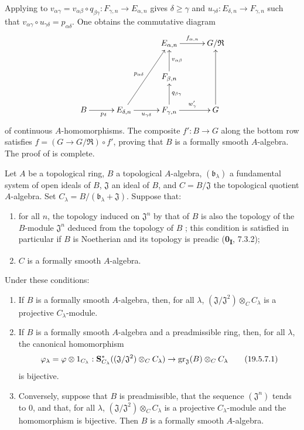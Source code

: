 \begin{env}[19.5.6.8]
Applying  to
$v_{\alpha\gamma}=v_{\alpha\beta}\circ q_{\beta\gamma}:F_{\gamma,n}\to E_{\alpha,n}$
gives $\delta\geq\gamma$ and $u_{\gamma\delta}:E_{\delta,n}\to F_{\gamma,n}$ such that
$v_{\alpha\gamma}\circ u_{\gamma\delta}=p_{\alpha\delta}$.
One obtains the commutative diagram
\[
\xymatrix@C=3em@R=2.5em{
  && E_{\alpha,n} \ar[r]^{f_{\alpha,n}} & G/\mathfrak{R} \\
  && F_{\beta,n} \ar[u]_{v_{\alpha\beta}} & \\
  B \ar[r]_{p_\delta} & E_{\delta,n} \ar[uur]^{p_{\alpha\delta}} \ar[r]_{u_{\gamma\delta}} & F_{\gamma,n} \ar[u]_{q_{\beta\gamma}} \ar[r]^{w'_\gamma} & G \ar[uu]
}
\]
of continuous $A$-homomorphisms.
The composite $f':B\to G$ along the bottom row satisfies $f=(G\to G/\mathfrak{R})\circ f'$, proving that $B$ is a formally smooth $A$-algebra.
The proof of  is complete.
\end{env}

\begin{corollary}[19.5.7]
\label{0.19.5.7}
Let $A$ be a topological ring, $B$ a topological $A$-algebra, $(\mathfrak{b}_\lambda)$ a fundamental system of open ideals of $B$, $\mathfrak{J}$ an ideal of $B$, and $C=B/\mathfrak{J}$ the topological quotient $A$-algebra.
Set $C_\lambda=B/(\mathfrak{b}_\lambda+\mathfrak{J})$.
Suppose that:
\begin{enumerate}
  \item[$1^\circ$] for all $n$, the topology induced on $\mathfrak{J}^n$ by that of $B$ is also the topology of the $B$-module $\mathfrak{J}^n$ deduced from the topology of $B$ ; this condition is satisfied in particular if $B$ is Noetherian and its topology is preadic (\textbf{0\textsubscript{I}}, 7.3.2);
  \item[$2^\circ$] $C$ is a formally smooth $A$-algebra.
\end{enumerate}
Under these conditions:
\begin{enumerate}
  \item[\rm(i)] If $B$ is a formally smooth $A$-algebra, then, for all $\lambda$, $(\mathfrak{J}/\mathfrak{J}^2)\otimes_C C_\lambda$ is a projective $C_\lambda$-module.
  \item[\rm(ii)] If $B$ is a formally smooth $A$-algebra and a preadmissible ring, then, for all $\lambda$, the canonical homomorphism
  \[
    \label{0.19.5.7.1}
    \varphi_\lambda=\varphi\otimes 1_{C_\lambda}:
    \mathbf{S}_{C_\lambda}^*((\mathfrak{J}/\mathfrak{J}^2)\otimes_C C_\lambda)
    \to \operatorname{gr}_\mathfrak{J}(B)\otimes_C C_\lambda
    \tag{19.5.7.1}
  \]
  is bijective.
  \item[\rm(iii)] Conversely, suppose that $B$ is preadmissible, that the sequence $(\mathfrak{J}^n)$ tends to $0$, and that, for all $\lambda$, $(\mathfrak{J}/\mathfrak{J}^2)\otimes_C C_\lambda$ is a projective $C_\lambda$-module and the homomorphism  is bijective.
  Then $B$ is a formally smooth $A$-algebra.
\end{enumerate}
\end{corollary}

